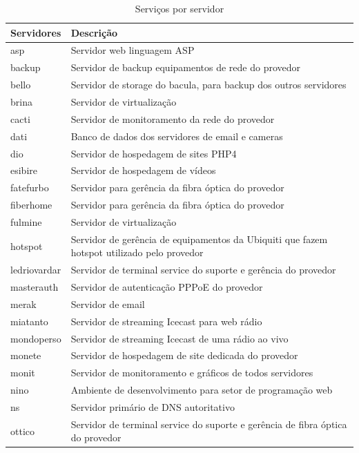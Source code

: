 \begin{table}
\caption {Serviços por servidor}
\label{tab:servporservidor}

\begin{center}
\begin{tabular}{|l|p{12cm}|}\hline
Servidores & Descrição\\\hline
asp & Servidor web linguagem ASP\\\hline
backup & Servidor de backup equipamentos de rede do provedor\\\hline
bello & Servidor de storage do bacula, para backup dos outros servidores\\\hline
brina & Servidor de virtualização\\\hline
cacti & Servidor de monitoramento da rede do provedor\\\hline
dati & Banco de dados dos servidores de email e cameras\\\hline
dio & Servidor de hospedagem de sites PHP4\\\hline
esibire & Servidor de hospedagem de vídeos\\\hline
fatefurbo & Servidor para gerência da fibra óptica do provedor\\\hline
fiberhome & Servidor para gerência da fibra óptica do provedor\\\hline
fulmine & Servidor de virtualização\\\hline
hotspot & Servidor de gerência de equipamentos da Ubiquiti que fazem hotspot utilizado pelo provedor\\\hline
ledriovardar & Servidor de terminal service do suporte e gerência do provedor\\\hline
masterauth & Servidor de autenticação PPPoE do provedor\\\hline
merak & Servidor de email\\\hline
miatanto & Servidor de streaming Icecast para web rádio\\\hline
mondoperso & Servidor de streaming Icecast de uma rádio ao vivo\\\hline
monete & Servidor de hospedagem de site dedicada do provedor\\\hline
monit & Servidor de monitoramento e gráficos de todos servidores\\\hline
nino & Ambiente de desenvolvimento para setor de programação web\\\hline
ns & Servidor primário de DNS autoritativo\\\hline
ottico & Servidor de terminal service do suporte e gerência de fibra óptica do provedor\\\hline

\end{tabular}
\end{center}
\end{table}
